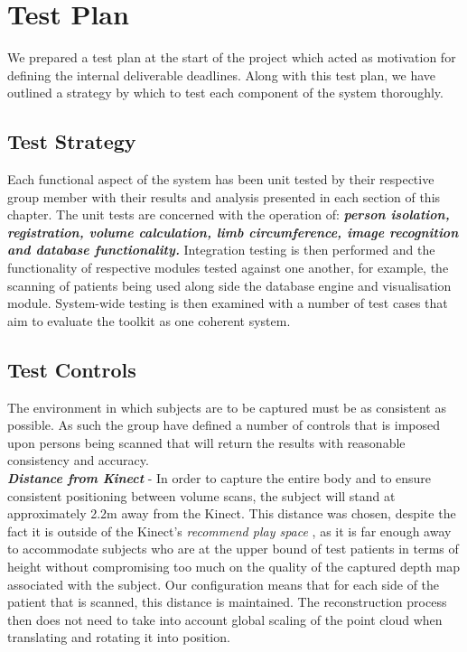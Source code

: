\section{Test Plan}

We prepared a test plan at the start of the project which acted as motivation for defining the internal deliverable deadlines. Along with this test plan, we have outlined a strategy by which to test each component of the system thoroughly.

\subsection{Test Strategy}

\label{test strategy}

Each functional aspect of the system has been unit tested by their respective group member with their results and analysis presented in each section of this chapter. The unit tests are concerned with the operation of: \emph{\bf{person isolation, registration, volume calculation, limb circumference, image recognition and database functionality.}} Integration testing is then performed and the functionality of respective modules tested against one another, for example, the scanning of patients being used along side the database engine and visualisation module. System-wide testing is then examined with a number of test cases that aim to evaluate the toolkit as one coherent system.

\subsection{Test Controls}

The environment in which subjects are to be captured must be as consistent as possible. As such the group have defined a number of controls that is imposed upon persons being scanned that will return the results with reasonable consistency and accuracy.\\

\emph{\bf{Distance from Kinect}} - In order to capture the entire body and to ensure consistent positioning between volume scans, the subject will stand at approximately 2.2m away from the Kinect. This distance was chosen, despite the fact it is outside of the Kinect's \emph{recommend play space} \cite{xbox2010}, as it is far enough away to accommodate subjects who are at the upper bound of test patients in terms of height without compromising too much on the quality of the captured depth map associated with the subject. Our configuration means that for each side of the patient that is scanned, this distance is maintained. The reconstruction process then does not need to take into account global scaling of the point cloud when translating and rotating it into position. \\

